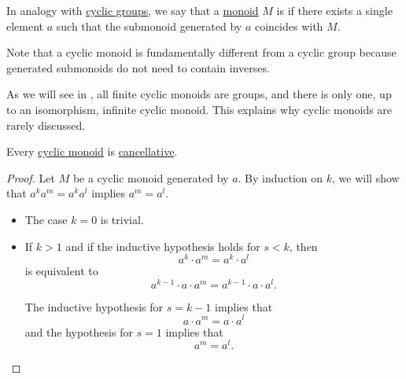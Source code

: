 \begin{definition}\label{def:cyclic_monoid}
  In analogy with \hyperref[def:cyclic_group]{cyclic groups}, we say that a \hyperref[def:monoid]{monoid} \( M \) is  if there exists a single element \( a \) such that the submonoid generated by \( a \) coincides with \( M \).
\end{definition}
\begin{comments}
  \item Note that a cyclic monoid is fundamentally different from a cyclic group because generated submonoids do not need to contain inverses.
  \item As we will see in , all finite cyclic monoids are groups, and there is only one, up to an isomorphism, infinite cyclic monoid. This explains why cyclic monoids are rarely discussed.
\end{comments}

\begin{lemma}\label{thm:cyclic_monoid_cancellative}
  Every \hyperref[def:cyclic_monoid]{cyclic monoid} is \hyperref[def:binary_operation/cancellative]{cancellative}.
\end{lemma}
\begin{proof}
  Let \( M \) be a cyclic monoid generated by \( a \). By induction on \( k \), we will show that \( a^k a^m = a^k a^l \) implies \( a^m = a^l \).
  \begin{itemize}
    \item The case \( k = 0 \) is trivial.
    \item If \( k > 1 \) and if the inductive hypothesis holds for \( s < k \), then
    \begin{equation*}
      a^k \cdot a^m = a^k \cdot a^l
    \end{equation*}
    is equivalent to
    \begin{equation*}
      a^{k - 1} \cdot a \cdot a^m = a^{k - 1} \cdot a \cdot a^l.
    \end{equation*}

    The inductive hypothesis for \( s = k - 1 \) implies that
    \begin{equation*}
      a \cdot a^m = a \cdot a^l
    \end{equation*}
    and the hypothesis for \( s = 1 \) implies that
    \begin{equation*}
      a^m = a^l.
    \end{equation*}
  \end{itemize}
\end{proof}

